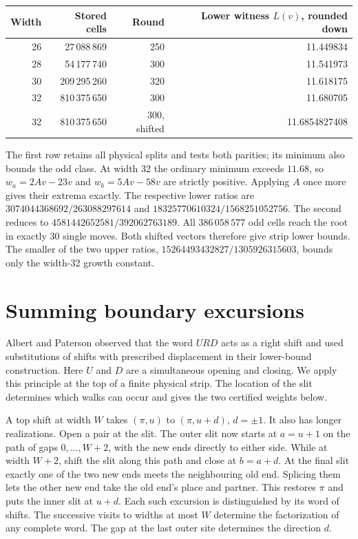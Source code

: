 \documentclass[11pt]{article}
\newcommand{\result}{11.6854827408}
\newcommand{\wnum}{4581442652581}
\newcommand{\wden}{392062763189}
\begin{document}
\begin{center}
\small
\begin{tabular}{rrrr}
\toprule
Width & Stored cells & Round & Lower witness \(L(v)\), rounded down\\
\midrule
26 & 27\,088\,869 & 250 & 11.449834\\
28 & 54\,177\,740 & 300 & 11.541973\\
30 & 209\,295\,260 & 320 & 11.618175\\
32 & 810\,375\,650 & 300 & 11.680705\\
32 & 810\,375\,650 & 300, shifted & \result\\
\bottomrule
\end{tabular}
\end{center}
\noindent The first row retains all physical splits and tests both parities; its minimum also bounds the odd class. At width 32 the ordinary minimum exceeds \(11.68\), so \(w_a=2Av-23v\) and \(w_b=5Av-58v\) are strictly positive. Applying \(A\) once more gives their extrema exactly. The respective lower ratios are \(3074044368692/263088297614\) and \(18325770610324/1568251052756\). The second reduces to \(\wnum/\wden\). All \(386\,058\,577\) odd cells reach the root in exactly 30 single moves. Both shifted vectors therefore give strip lower bounds. The smaller of the two upper ratios, \(15264493432827/1305926315603\), bounds only the width-32 growth constant.

\section{Summing boundary excursions}\label{exits}
Albert and Paterson \cite{ap} observed that the word \(URD\) acts as a right shift and used substitutions of shifts with prescribed displacement in their lower-bound construction. Here \(U\) and \(D\) are a simultaneous opening and closing. We apply this principle at the top of a finite physical strip. The location of the slit determines which walks can occur and gives the two certified weights below.

A top shift at width \(W\) takes \((\pi,u)\) to \((\pi,u+d)\), \(d=\pm1\). It also has longer realizations. Open a pair at the slit. The outer slit now starts at \(a=u+1\) on the path of gaps \(0,\ldots,W+2\), with the new ends directly to either side. While at width \(W+2\), shift the slit along this path and close at \(b=a+d\). At the final slit exactly one of the two new ends meets the neighbouring old end. Splicing them lets the other new end take the old end's place and partner. This restores \(\pi\) and puts the inner slit at \(u+d\). Each such excursion is distinguished by its word of shifts. The successive visits to widths at most \(W\) determine the factorization of any complete word. The gap at the last outer site determines the direction \(d\).
\end{document}
